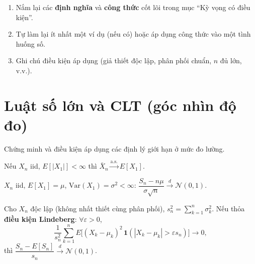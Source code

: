 \documentclass[12pt,a4paper]{article}
\begin{document}

\begin{tongket}[title={Tổng kết: Kỳ vọng có điều kiện}]
\begin{enumerate}
  \item Nắm lại các \textbf{định nghĩa} và \textbf{công thức} cốt lõi trong mục ``Kỳ vọng có điều kiện''.
  \item Tự làm lại ít nhất một ví dụ (nếu có) hoặc áp dụng công thức vào một tình huống số.
  \item Ghi chú điều kiện áp dụng (giả thiết độc lập, phân phối chuẩn, $n$ đủ lớn, v.v.).
\end{enumerate}
\end{tongket}

\section{Luật số lớn và CLT (góc nhìn độ đo)}

\begin{dongco}[title={Động cơ --- Luật số lớn và CLT (góc nhìn độ đo)}]
Chứng minh và điều kiện áp dụng các định lý giới hạn ở mức đo lường.
\end{dongco}

\begin{dinhly}[title={Luật mạnh số lớn (Kolmogorov)}]
  Nếu $X_n$ iid, $E[|X_1|] < \infty$ thì $\bar{X}_n \xrightarrow{\text{a.s.}} E[X_1]$.
\end{dinhly}

\begin{dinhly}[title={CLT Lindeberg--Lévy}]
  $X_n$ iid, $E[X_1] = \mu$, $\text{Var}(X_1) = \sigma^2 < \infty$:
  $\dfrac{S_n - n\mu}{\sigma\sqrt{n}} \xrightarrow{d} \mathcal{N}(0, 1)$.
\end{dinhly}

\begin{dinhly}[title={CLT Lindeberg--Feller (không đồng phân phối)}]
  Cho $X_n$ độc lập (không nhất thiết cùng phân phối), $s_n^2 = \sum_{k=1}^n \sigma_k^2$. Nếu thỏa \textbf{điều kiện Lindeberg}: $\forall \varepsilon > 0$,
  \[
    \frac{1}{s_n^2}\sum_{k=1}^n E\bigl[(X_k - \mu_k)^2\,\mathbf{1}(|X_k - \mu_k| > \varepsilon s_n)\bigr] \to 0,
  \]
  thì $\dfrac{S_n - E[S_n]}{s_n} \xrightarrow{d} \mathcal{N}(0, 1)$.
\end{dinhly}
\end{document}

